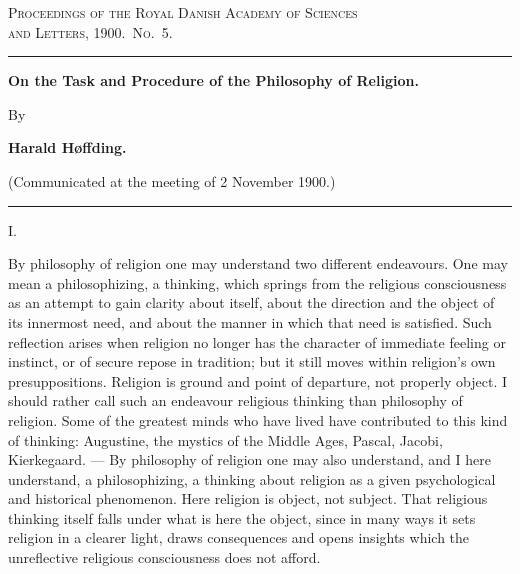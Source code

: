 \documentclass[12pt,a4paper]{article}
\newcommand{\snum}[1]{\bigskip\begin{center}#1\end{center}\nopagebreak\medskip}
\newcommand{\opage}[1]{\marginnote{\footnotesize\textit{[#1]}}}
\begin{document}
\begin{center}
  {\footnotesize\scshape Proceedings of the Royal Danish Academy of Sciences\\
   and Letters, 1900.\ No.\ 5.}

  \rule{4em}{0.4pt}

  \bigskip
  {\large\bfseries On the Task and Procedure of the Philosophy of Religion.}

  \medskip
  By

  \smallskip
  {\bfseries Harald Høffding.}

  \smallskip
  {\small (Communicated at the meeting of 2 November 1900.)}

  \medskip
  \rule{4em}{0.4pt}
\end{center}

\medskip

\snum{I.}

\opage{411}By philosophy of religion one may understand two different endeavours. One may
mean a philosophizing, a thinking, which springs from the religious
consciousness as an attempt to gain clarity about itself, about the direction
and the object of its innermost need, and about the manner in which that need
is satisfied. Such reflection arises when religion no longer has the character
of immediate feeling or instinct, or of secure repose in tradition; but it
still moves within religion's own presuppositions. Religion is ground and point
of departure, not properly object. I should rather call such an endeavour
religious thinking than philosophy of religion. Some of the greatest minds who
have lived have contributed to this kind of thinking: Augustine, the mystics of
the Middle Ages, Pascal, Jacobi, Kierkegaard. --- By philosophy of religion one
may also understand, and I here understand, a philosophizing, a thinking about
religion as a given psychological and historical phenomenon. Here religion is
object, not subject. That religious thinking itself falls under what is here
the object, since in many ways it sets religion in a clearer light, draws
\opage{412}consequences
and opens insights which the unreflective religious consciousness does not
afford.
\end{document}
